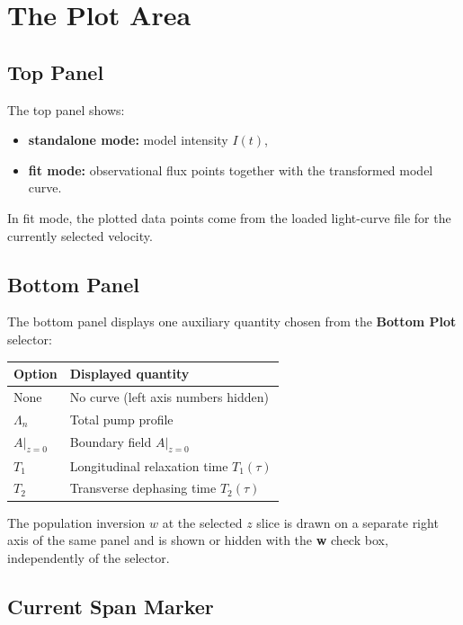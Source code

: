 \documentclass[12pt,a4paper]{article}
\begin{document}
\section{The Plot Area}

\subsection{Top Panel}

The top panel shows:
\begin{itemize}[noitemsep]
  \item \textbf{standalone mode:} model intensity $I(t)$,
  \item \textbf{fit mode:} observational flux points together with the transformed model curve.
\end{itemize}
In fit mode, the plotted data points come from the loaded light-curve file for the currently selected velocity.

\subsection{Bottom Panel}

The bottom panel displays one auxiliary quantity chosen from the \textbf{Bottom Plot} selector:
\begin{center}
\begin{tabular}{@{}ll@{}}
  \toprule
  Option & Displayed quantity \\
  \midrule
  None & No curve (left axis numbers hidden) \\
  $\Lambda_n$ & Total pump profile \\
  $A\vert_{z=0}$ & Boundary field $A\vert_{z=0}$ \\
  $T_1$ & Longitudinal relaxation time $T_1(\tau)$ \\
  $T_2$ & Transverse dephasing time $T_2(\tau)$ \\
  \bottomrule
\end{tabular}
\end{center}
The population inversion $w$ at the selected $z$ slice is drawn on a separate right axis of the
same panel and is shown or hidden with the \textbf{w} check box, independently of the selector.

\subsection{Current Span Marker}\label{sec:current-span}
\end{document}
